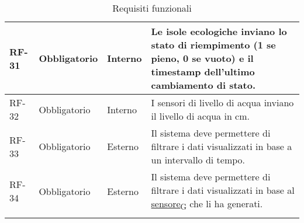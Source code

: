 \begin{longtable}{|>{\centering\arraybackslash}m{}|>{\centering\arraybackslash}m{}|>{\centering\arraybackslash}m{}|>{\centering\arraybackslash}m{}|}
	RF-31           & Obbligatorio        & Interno                                                                                                           & Le isole ecologiche inviano lo stato di riempimento (1 se pieno, 0 se vuoto) e il timestamp dell'ultimo cambiamento di stato.                                                                                                                                                                                                                                                                                                                                                                        \\\hline
	RF-32           & Obbligatorio        & Interno                                                                                                           & I sensori di livello di acqua inviano il livello di acqua in cm.                                                                                                                                                                                                                                                                                                                                                                                                                                     \\\hline
	RF-33           & Obbligatorio        & Esterno                                                                                                           & Il sistema deve permettere di filtrare i dati visualizzati in base a un intervallo di tempo.                                                                                                                                                                                                                                                                                                                                                                                                         \\\hline
	RF-34           & Obbligatorio        & Esterno                                                                                                           & Il sistema deve permettere di filtrare i dati visualizzati in base al \href{https://7last.github.io/docs/rtb/documentazione-interna/glossario\#sensore}{sensore\textsubscript{G}} che li ha generati.                                                                                                                                                                                                                                                                                                \\\hline
	\caption{Requisiti funzionali}
	\label{table:1}
\end{longtable}

